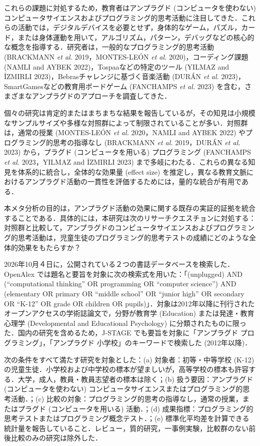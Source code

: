 \documentclass[
  lualatex, ja=standard, paper={182mm,257mm}, twocolumn, fontsize=8.5pt, baselineskip=13.5pt,
  line_length=24zw, column_gap=6.1mm, number_of_lines=45, head_space=24.5mm, gutter=16.25mm
]{jlreq}
\newcommand{\chap}[2]{\par\vspace{13.5pt}\needspace{4\baselineskip}{\centering\gtfamily\bfseries #1．#2\par}\nopagebreak}
\newcommand{\secn}[3]{\par\needspace{3\baselineskip}{\noindent\gtfamily\bfseries #1.#2.\hspace{1\zw}#3\par}\nopagebreak}
\begin{document}
これらの課題に対処するため，教育者はアンプラグド (コンピュータを使わない) コンピュータサイエンスおよびプログラミング的思考活動に注目してきた．これらの活動では，デジタルデバイスを必要とせず，身体的なゲーム，パズル，カード，または身体運動を用いて，アルゴリズム，パターン，デバッグなどの核心的な概念を指導する．研究者は，一般的なプログラミング的思考活動 (BRACKMANN \textit{et al.} 2019，MONTES-LEÓN \textit{et al.} 2020)，コーディング課題 (NAMLI and AYBEK 2022)，Tospaaなどの特定のツール (YILMAZ and İZMIRLI 2023)，Bebrasチャレンジに基づく音楽活動 (DURÁN \textit{et al.} 2023)，SmartGamesなどの教育用ボードゲーム (FANCHAMPS \textit{et al.} 2023) を含む，さまざまなアンプラグドのアプローチを調査してきた．

個々の研究は肯定的またはまちまちな結果を報告しているが，その知見は小規模なサンプルサイズや多様な対照群によって制限されていることが多い．対照群は，通常の授業 (MONTES-LEÓN \textit{et al.} 2020，NAMLI and AYBEK 2022) やプログラミング的思考の指導なし (BRACKMANN \textit{et al.} 2019，DURÁN \textit{et al.} 2023) から，プラグド (コンピュータを用いる) プログラミング (FANCHAMPS \textit{et al.} 2023，YILMAZ and İZMIRLI 2023) まで多岐にわたる．これらの異なる知見を体系的に統合し，全体的な効果量 (effect size) を推定し，異なる教育文脈におけるアンプラグド活動の一貫性を評価するためには，量的な統合が有用である．

本メタ分析の目的は，アンプラグド活動の効果に関する既存の実証的証拠を統合することである．具体的には，本研究は次のリサーチクエスチョンに対処する：対照群と比較して，アンプラグドのコンピュータサイエンスおよびプログラミング的思考活動は，児童生徒のプログラミング的思考テストの成績にどのような全体的効果をもたらすか？

\chap{2}{方法}
\secn{2}{1}{文献の検索}
2026年10月４日に，公開されている２つの書誌データベースを検索した．OpenAlex では題名と要旨を対象に次の検索式を用いた：「(unplugged) AND (“computational thinking” OR programming OR “computer science”) AND (elementary OR primary OR “middle school” OR “junior high” OR secondary OR “K-12” OR grade OR children OR pupils)」．対象は2012年以降に刊行されたオープンアクセスの学術誌論文で，分野が教育学 (Education) または発達・教育心理学 (Developmental and Educational Psychology) に分類されたものに限った．国内の研究を含めるため，J-STAGE でも要旨を対象に「アンプラグド プログラミング」，「アンプラグド 小学校」のキーワードで検索した (2012年以降)．

\secn{2}{2}{適格基準}
次の条件をすべて満たす研究を対象とした：(a) 対象者：初等・中等学校 (K-12) の児童生徒．小学校および中学校の標本が望ましいが，高等学校の標本も許容する．大学，成人，教員・教員志望者の標本は除く；(b) 扱う要因：アンプラグド (コンピュータを使わない) コンピュータサイエンスまたはプログラミング的思考活動．；(c) 比較の対象：プログラミング的思考の指導なし，通常の授業，またはプラグド (コンピュータを用いる) 活動．；(d) 成果指標：プログラミング的思考テストまたはプログラミング概念テスト．；(e) 標準化平均差を計算できる統計量を報告していること．レビュー，質的研究，一事例実験，比較群のない前後比較のみの研究は除外した．
\end{document}
